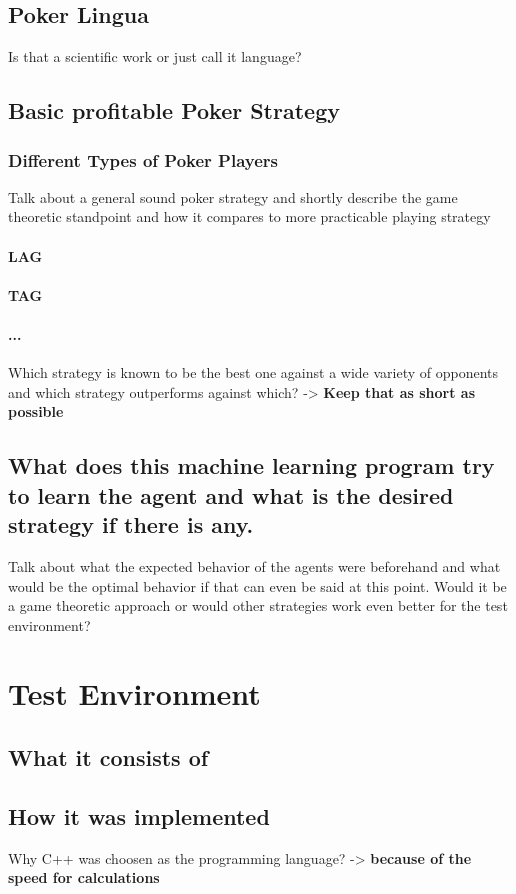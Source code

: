 \section{Poker Lingua}
Is that a scientific work or just call it language?
\section{Basic profitable Poker Strategy}
\subsection{Different Types of Poker Players}
Talk about a general sound poker strategy and shortly describe the game theoretic standpoint and how it compares to more practicable playing strategy
\subsubsection{LAG}
\subsubsection{TAG}
\subsubsection{...}
Which strategy is known to be the best one against a wide variety of opponents and which strategy outperforms against which? -> \textbf{Keep that as short as possible}
\section{What does this machine learning program try to learn the agent and what is the desired strategy if there is any.}
Talk about what the expected behavior of the agents were beforehand and what would be the optimal behavior if that can even be said at this point. Would it be a game theoretic approach or would other strategies work even better for the test environment?
\chapter{Test Environment}
\section{What it consists of}
\section{How it was implemented}
Why C++ was choosen as the programming language? -> \textbf{because of the speed for calculations}
